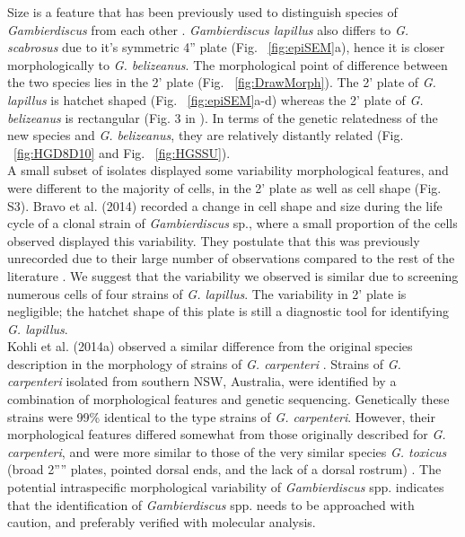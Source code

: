\documentclass[12pt]{article}
\begin{document}
 Size is a feature that has been previously used to distinguish species of \emph{Gambierdiscus} from each other \citep{litaker2009taxonomy}. 
\emph{Gambierdiscus lapillus} also differs to \emph{G. scabrosus} due to it's symmetric 4'' plate (Fig. ~\ref{fig:epiSEM}a), hence it is closer morphologically to \emph{G. belizeanus}. 
The morphological point of difference between the two species lies in the 2' plate (Fig. ~\ref{fig:DrawMorph}).  
The 2' plate of \emph{G. lapillus} is hatchet shaped (Fig. ~\ref{fig:epiSEM}a-d) whereas the 2' plate of \emph{G. belizeanus} is rectangular (Fig. 3 in \citep{faust1995observation}). 
In terms of the genetic relatedness of the new species and \textit{G. belizeanus}, they are relatively distantly related (Fig. ~\ref{fig:HGD8D10} and Fig. ~\ref{fig:HGSSU}). \\
A small subset of isolates displayed some variability morphological features, and were different to the majority of cells, in the 2' plate as well as cell shape (Fig. S3).  
Bravo et al. (2014) recorded a change in cell shape and size during the life cycle of a clonal strain of \emph{Gambierdiscus} sp., where a small proportion of the cells observed displayed this variability. 
They postulate that this was previously unrecorded due to their large number of observations compared to the rest of the literature \citep{bravo2014cellular}. 
We suggest that the variability we observed is similar due to screening numerous cells of four strains of \emph{G. lapillus}. 
The variability in 2' plate is negligible; the hatchet shape of this plate is still a diagnostic tool for identifying \textit{G. lapillus}.\\
Kohli et al. (2014a) observed a similar difference from the original species description in the morphology of strains of  \emph{G. carpenteri} \citep{kohli2014high}. 
Strains of \emph{G. carpenteri} isolated from southern NSW, Australia, were identified by a combination of morphological features and genetic sequencing. 
Genetically these strains were 99\% identical to the type strains of \textit{G. carpenteri}. 
However, their morphological features differed somewhat from those originally described for \textit{G. carpenteri}, and were more similar to those of the very similar species \emph{G. toxicus} (broad 2'''' plates, pointed dorsal ends, and the lack of a dorsal rostrum) \citep{kohli2014high,litaker2009taxonomy}.
The potential intraspecific morphological variability of \emph{Gambierdiscus} spp. indicates that the identification of \emph{Gambierdiscus} spp. needs to be approached with caution, and preferably verified with molecular analysis.\\
\end{document}
